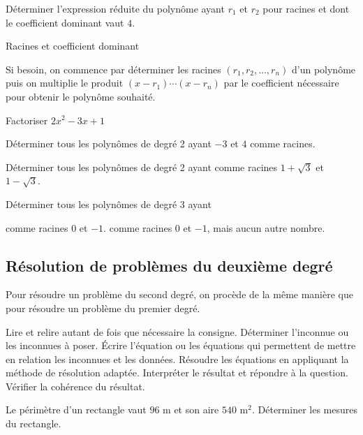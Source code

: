 \documentclass[a4paper,12pt]{article}
\begin{document}
Déterminer l'expression réduite du polynôme ayant $r_1$ et $r_2$ pour racines et dont le coefficient dominant vaut $4$.
\begin{exemple}
	Racines et coefficient dominant
	\tcblower

	\vspace{6cm}	

\end{exemple}
Si besoin, on commence par déterminer les racines $(r_1, r_2, \ldots, r_n)$ d'un polynôme puis on multiplie le produit $(x-r_1)\cdots (x-r_n)$ par le coefficient nécessaire pour obtenir le polynôme souhaité. 
\begin{exemple}
	Factoriser $2x^2-3x+1$
	\tcblower
	\vspace{8cm}
\end{exemple}
\begin{exercice}
	\tcblower
	Déterminer tous les polynômes de degré 2 ayant $-3$ et $4$ comme racines.
\end{exercice}
\begin{exercice}
	\tcblower
	Déterminer tous les polynômes de degré 2 ayant comme racines $1+\sqrt{3}$ et $1-\sqrt{3}$.
\end{exercice}
\begin{exercice}
	\tcblower
	Déterminer tous les polynômes de degré 3 ayant
\begin{tasks}
	\task comme racines $0$ et $-1$.
	\task comme racines $0$ et $-1$, mais aucun autre nombre.
\end{tasks}
\end{exercice}
\newpage
\subsection{Résolution de problèmes du deuxième degré}
Pour résoudre un problème du second degré, on procède de la même manière que pour résoudre un problème du premier degré.
\begin{tasks}
	\task Lire et relire autant de fois que nécessaire la consigne.
	\task Déterminer l'inconnue ou les inconnues à poser.
	\task Écrire l'équation ou les équations qui permettent de mettre en relation les inconnues et les données.
	\task Résoudre les équations en appliquant la méthode de résolution adaptée.
	\task Interpréter le résultat et répondre à la question.
	\task Vérifier la cohérence du résultat.
\end{tasks}

\begin{exemple}
	Le périmètre d'un rectangle vaut $96$ m et son aire $540$ m$^2$. Déterminer les mesures du rectangle.
	\tcblower

	\vspace{19cm}	

\end{exemple}
\newpage
\end{document}
